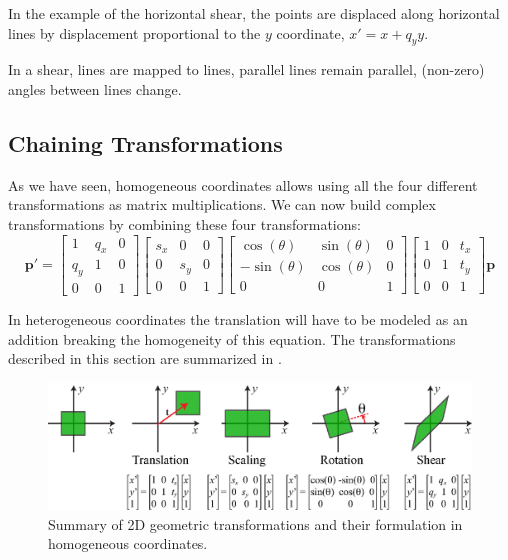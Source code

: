 In the example of the horizontal shear, the points are displaced along horizontal lines by displacement proportional to the $y$ coordinate, $x'=x+q_y y$. 

In a shear, lines are mapped to lines, parallel lines remain parallel, (non-zero) angles between lines change.

\subsection{Chaining Transformations}
\label{sec:chaining_transformations}

As we have seen, homogeneous coordinates allows using all the four different transformations as matrix multiplications. We can now build complex transformations by combining these four transformations:
\begin{equation}
    \mathbf{p}' = 
    \begin{bmatrix}
    1 & q_x & 0 \\
    q_y & 1 & 0 \\
    0 & 0 & 1
    \end{bmatrix}
    \begin{bmatrix}
    s_x & 0 & 0 \\
    0 & s_y & 0 \\
    0 & 0 & 1
    \end{bmatrix}
    \begin{bmatrix}
    \cos(\theta) & \sin(\theta) & 0 \\
    -\sin(\theta) & \cos(\theta) & 0 \\
    0 & 0 & 1
    \end{bmatrix}
    \begin{bmatrix}
    1 & 0 & t_x \\
    0 & 1 & t_y \\
    0 & 0 & 1
    \end{bmatrix}
    \mathbf{p}
\end{equation}


 In heterogeneous coordinates the translation will have to be modeled as an addition breaking the homogeneity of this equation. The transformations described in this section are summarized in \fig{\ref{fig:2dtransformations}}.

\begin{figure}
\centerline{
\includegraphics[width=1\linewidth]{figures/imaging_geometry/2d_transforms.eps}
}
\caption{Summary of 2D geometric transformations and their formulation in homogeneous coordinates.}
\label{fig:2dtransformations}
\end{figure}


